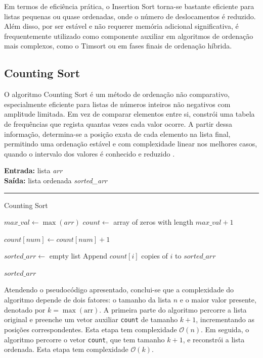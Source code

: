 \documentclass[conference]{IEEEtran}
\begin{document}
Em termos de eficiência prática, o Insertion Sort torna-se bastante eficiente para listas pequenas ou quase ordenadas, onde o número de deslocamentos é reduzido. Além disso, por ser estável e não requerer memória adicional significativa, é frequentemente utilizado como componente auxiliar em algoritmos de ordenação mais complexos, como o Timsort ou em fases finais de ordenação híbrida.

\subsection{Counting Sort}

O algoritmo Counting Sort é um método de ordenação não comparativo, especialmente eficiente para listas de números inteiros não negativos com amplitude limitada. Em vez de comparar elementos entre si, constrói uma tabela de frequências que regista quantas vezes cada valor ocorre. A partir dessa informação, determina-se a posição exata de cada elemento na lista final, permitindo uma ordenação estável e com complexidade linear nos melhores casos, quando o intervalo dos valores é conhecido e reduzido \cite{song2023improvement}.

\begin{algorithm}[H]
    \raggedright
    \vspace{.1em}
    \textbf{Entrada:} lista \textit{arr} \\
    \textbf{Saída:} lista ordenada \textit{sorted\_arr} \\
    \vspace{.5em}
    \hrule 
    \caption{Counting Sort}
    \begin{algorithmic}[1]
        \State $max\_val \gets \max(arr)$
        \State $count \gets$ array of zeros with length $max\_val + 1$
        
            \State $count[num] \gets count[num] + 1$
        \EndFor
    
        \State $sorted\_arr \gets$ empty list
                \State Append $count[i]$ copies of $i$ to $sorted\_arr$
            \EndIf
        \EndFor
    
        \State \Return $sorted\_arr$
    \end{algorithmic}
\end{algorithm}

Atendendo o pseudocódigo apresentado, conclui-se que a complexidade do algoritmo depende de dois fatores: o tamanho da lista \( n \) e o maior valor presente, denotado por \( k = \max(\text{arr}) \). A primeira parte do algoritmo percorre a lista original e preenche um vetor auxiliar \texttt{count} de tamanho \( k + 1 \), incrementando as posições correspondentes. Esta etapa tem complexidade \(\mathcal{O}(n)\). Em seguida, o algoritmo percorre o vetor \texttt{count}, que tem tamanho \( k + 1 \), e reconstrói a lista ordenada. Esta etapa tem complexidade \(\mathcal{O}(k)\).
\end{document}
